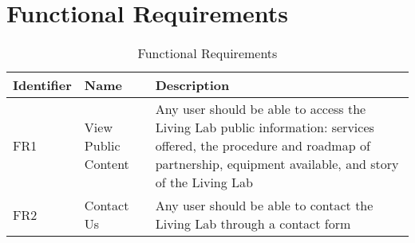 \section{Functional Requirements}

\begin{table}[htp]

\begin{center}
\begin{tabular}{ p{3cm} | p{5cm} | p{8cm} }
\textbf{Identifier} & \textbf{Name} & \textbf{Description} \\
\hline

\fussy FR1 & \fussy View Public Content & \fussy Any user should be able to access the Living Lab public information: services offered, the procedure and roadmap of partnership, equipment available, and story of the Living Lab\\ \hline
\fussy FR2 & \fussy Contact Us & \fussy Any user should be able to contact the Living Lab through a contact form\\ \hline

\end{tabular} \label{functionalRequirements}
\caption{Functional Requirements} \label{functionalRequirements}
\end{center}
\end{table}

